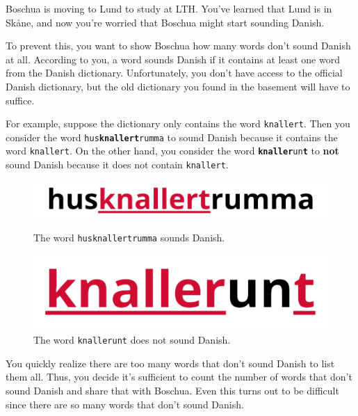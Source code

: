 
\noindent

Boschua is moving to Lund to study at LTH. 
You've learned that Lund is in Skåne, and now you're worried that Boschua might start sounding Danish.

To prevent this, you want to show Boschua how many words don't sound Danish at all. 
According to you, a word sounds Danish if it contains at least one word from the Danish dictionary. 
Unfortunately, you don't have access to the official Danish dictionary, but the old dictionary you found in the basement will have to suffice.

For example, suppose the dictionary only contains the word \texttt{knallert}. Then you consider the word \texttt{hus\textbf{knallert}rumma} 
to sound Danish because it contains the word \texttt{knallert}. On the other hand, you consider the word \texttt{\textbf{knaller}un\textbf{t}} 
to \textbf{not} sound Danish because it does not contain \texttt{knallert}.

\begin{figure}[h]
  \centering
  \begin{minipage}{0.45\textwidth}
    \centering
    \includegraphics[scale=0.7]{danska-knallert.png}
    \caption{The word \texttt{husknallertrumma} sounds Danish.}
  \end{minipage}\hfill
  \begin{minipage}{0.45\textwidth}
    \centering
    \includegraphics[scale=0.7]{knallerunt.png}
    \caption{The word \texttt{knallerunt} does not sound Danish.}
  \end{minipage}
\end{figure}

You quickly realize there are too many words that don't sound Danish to list them all. 
Thus, you decide it's sufficient to count the number of words that don't sound Danish and share that with Boschua. 
Even this turns out to be difficult since there are so many words that don't sound Danish.

